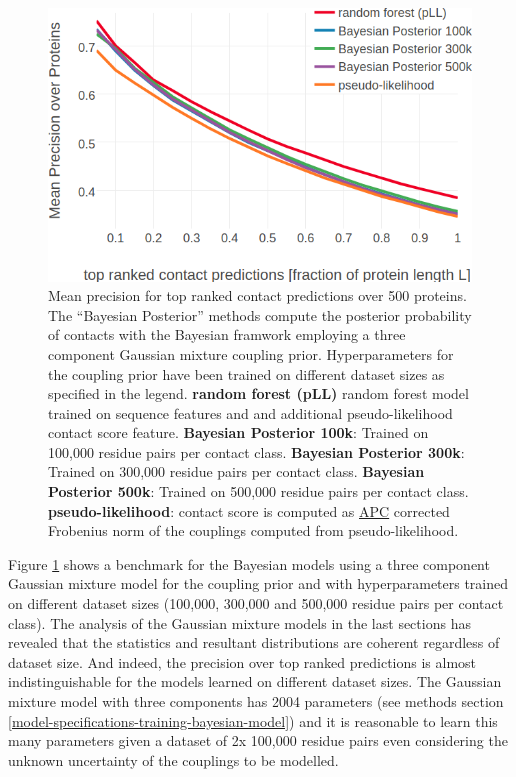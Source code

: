 \documentclass[11pt,a4paper,twoside]{book}
\theoremstyle{definition}
\theoremstyle{definition}
\theoremstyle{remark}
\begin{document}
\begin{figure}

{\centering \includegraphics[width=0.9\linewidth]{img/bayesian_model/benchmark/precision_vs_rank_pll_3comp_all_datasets} 

}

\caption{Mean precision for top
ranked contact predictions over 500 proteins. The ``Bayesian Posterior''
methods compute the posterior probability of contacts with the Bayesian
framwork employing a three component Gaussian mixture coupling prior.
Hyperparameters for the coupling prior have been trained on different
dataset sizes as specified in the legend. \textbf{random forest (pLL)}
random forest model trained on sequence features and and additional
pseudo-likelihood contact score feature. \textbf{Bayesian Posterior
100k}: Trained on 100,000 residue pairs per contact class.
\textbf{Bayesian Posterior 300k}: Trained on 300,000 residue pairs per
contact class. \textbf{Bayesian Posterior 500k}: Trained on 500,000
residue pairs per contact class. \textbf{pseudo-likelihood}: contact
score is computed as \protect\hyperlink{abbrev}{APC} corrected Frobenius
norm of the couplings computed from pseudo-likelihood.}\label{fig:precision-bayesian-model-pll-3comp}
\end{figure}

Figure \ref{fig:precision-bayesian-model-pll-3comp} shows a benchmark
for the Bayesian models using a three component Gaussian mixture model
for the coupling prior and with hyperparameters trained on different
dataset sizes (100,000, 300,000 and 500,000 residue pairs per contact
class). The analysis of the Gaussian mixture models in the last sections
has revealed that the statistics and resultant distributions are
coherent regardless of dataset size. And indeed, the precision over top
ranked predictions is almost indistinguishable for the models learned on
different dataset sizes. The Gaussian mixture model with three
components has 2004 parameters (see methods section
\ref{model-specifications-training-bayesian-model}) and it is reasonable
to learn this many parameters given a dataset of 2x 100,000 residue
pairs even considering the unknown uncertainty of the couplings to be
modelled.
\end{document}
